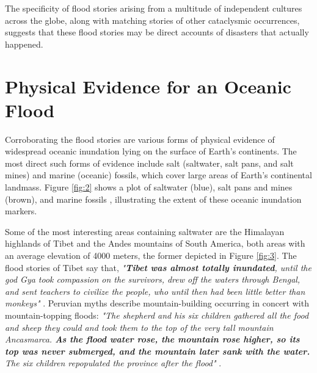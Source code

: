 \documentclass[10pt,twocolumn,letterpaper]{article}
\begin{document}
The specificity of flood stories arising from a multitude of independent cultures across the globe, along with matching stories of other cataclysmic occurrences, suggests that these flood stories may be direct accounts of disasters that actually happened.

\section{Physical Evidence for an Oceanic Flood}

Corroborating the flood stories are various forms of physical evidence of widespread oceanic inundation lying on the surface of Earth's continents. The most direct such forms of evidence include salt (saltwater, salt pans, and salt mines) and marine (oceanic) fossils, which cover large areas of Earth's continental landmass. Figure \ref{fig:2} shows a plot of saltwater (blue), salt pans and mines (brown), and marine fossils \cite{15,16,86,87}, illustrating the extent of these oceanic inundation markers.

Some of the most interesting areas containing saltwater are the Himalayan highlands of Tibet and the Andes mountains of South America, both areas with an average elevation of 4000 meters, the former depicted in Figure \ref{fig:3}. The flood stories of Tibet say that, \textit{"\textbf{Tibet was almost totally inundated}, until the god Gya took compassion on the survivors, drew off the waters through Bengal, and sent teachers to civilize the people, who until then had been little better than monkeys"} \cite{3}. Peruvian myths describe mountain-building occurring in concert with mountain-topping floods: \textit{"The shepherd and his six children gathered all the food and sheep they could and took them to the top of the very tall mountain Ancasmarca. \textbf{As the flood water rose, the mountain rose higher, so its top was never submerged, and the mountain later sank with the water.} The six children repopulated the province after the flood"} \cite{3}.
\end{document}
